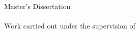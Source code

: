 \begin{titlepage}
\color{PANTONECoolGray7C}
\thelogo
\leading{20.4pt}
{\Large
\theauthor
\\
%
\\
\textbf{\thetitleA}
\\
\textbf{\thetitleB}
\\
\textbf{\thetitleC}
}

\vspace*{\fill}
{\footnotesize \myear}
\end{titlepage}

\null
\thispagestyle{empty}
\pagecolor{PANTONECoolGray7C}
\afterpage{\nopagecolor}
\newpage

\begin{titlepage}
\color{PANTONECoolGray7C}
\thelogoB
\leading{20.4pt}
{\Large
\theauthor
\\
%
\\
\textbf{\thetitleA}
\\
\textbf{\thetitleB}
\\
\textbf{\thetitleC}
}

\vspace{55.2mm}
\leading{16.8pt}
{\large
Master’s Dissertation
\\
\themasters
\\
\thearea
Work carried out under the supervision of
\\
\textbf{\thesupervisor}
\\
\thecosupervisor}

\vspace*{\fill}
{\footnotesize \myear}
\end{titlepage}

\null
\thispagestyle{empty}
\pagecolor{white}
\afterpage{\nopagecolor}
\newpage